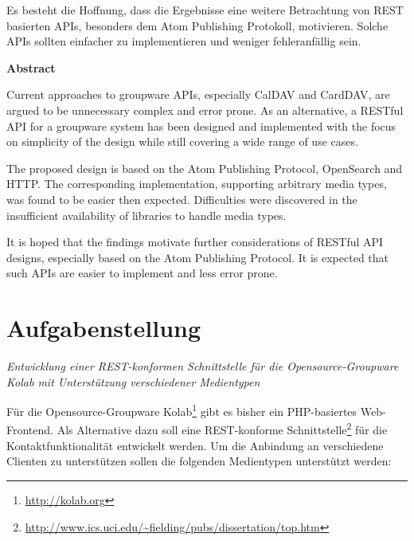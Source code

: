 \documentclass[11pt,a4paper,headsepline,twoside]{scrartcl}		%
\begin{document}
Es besteht die Hoffnung, dass die Ergebnisse eine weitere Betrachtung von REST
basierten APIs, besonders dem Atom Publishing Protokoll, motivieren. Solche APIs
sollten einfacher zu implementieren und weniger fehleranfällig sein.

\vspace{1cm}
\Large{\textbf{Abstract}}
\vspace{1cm}
\normalsize{}


  
  Current approaches to groupware APIs, especially CalDAV and CardDAV, are
  argued to be unnecessary complex and error prone.  As an alternative, a
  RESTful API for a groupware system has been designed and implemented with the
  focus on simplicity of the design while still covering a wide range of use
  cases.

  The proposed design is based on the Atom Publishing Protocol, OpenSearch
  and HTTP.
  The corresponding implementation, supporting arbitrary media types, was found
  to be easier then expected. Difficulties were discovered in the insufficient
  availability of libraries to handle media types.

  It is hoped that the findings motivate further considerations of RESTful API
  designs, especially based on the Atom Publishing Protocol. It is expected that
  such APIs are easier to implement and less error prone.

\section*{Aufgabenstellung}
\pagestyle{headings}
\textit{Entwicklung einer REST-konformen Schnittstelle für die 
Opensource-Groupware Kolab mit Unterstützung verschiedener Medientypen}

Für die Opensource-Groupware Kolab\footnote{\url{http://kolab.org}} gibt es
bisher ein PHP-basiertes Web-Frontend. Als Alternative dazu soll eine
REST-konforme
Schnittstelle\footnote{\url{http://www.ics.uci.edu/~fielding/pubs/dissertation/top.htm}}
für die Kontaktfunktionalität entwickelt werden. Um die Anbindung an
verschiedene Clienten zu unterstützen sollen die folgenden Medientypen
unterstützt werden:
\end{document}
